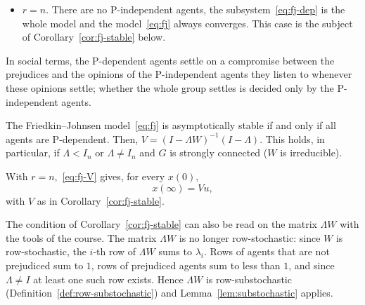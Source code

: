\begin{itemize}
  \item $r = n$. There are no P-independent agents, the subsystem~\eqref{eq:fj-dep} is
        the whole model and the model~\eqref{eq:fj} always converges. This case is the
        subject of Corollary~\ref{cor:fj-stable} below.
\end{itemize}
In social terms, the P-dependent agents settle on a compromise between the prejudices
and the opinions of the P-independent agents they listen to whenever these opinions
settle; whether the whole group settles is decided only by the P-independent agents.


\begin{corollary}
\label{cor:fj-stable}
The Friedkin--Johnsen model~\eqref{eq:fj} is asymptotically stable if and only if all
agents are P-dependent. Then, $V = (I - \Lambda W)^{-1}(I - \Lambda)$. This holds, in
particular, if $\Lambda < I_n$ or $\Lambda \neq I_n$ and $G$ is strongly connected
($W$ is irreducible).
\end{corollary}

With $r = n$,~\eqref{eq:fj-V} gives, for every $x(0)$,
\begin{equation}\label{eq:fj-V-all}
  x(\infty) = V u ,
\end{equation}
with $V$ as in Corollary~\ref{cor:fj-stable}.

The condition of Corollary~\ref{cor:fj-stable} can also be read on the matrix
$\Lambda W$ with the tools of the course. The matrix $\Lambda W$ is no longer
row-stochastic: since $W$ is row-stochastic, the $i$-th row of $\Lambda W$ sums to
$\lambda_i$. Rows of agents that are not prejudiced sum to $1$, rows of prejudiced
agents sum to less than $1$, and since $\Lambda \neq I$ at least one such row exists.
Hence $\Lambda W$ is row-substochastic (Definition~\ref{def:row-substochastic}) and
Lemma~\ref{lem:substochastic} applies.


